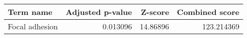 \begin{tabular}{lrrr}
\toprule
     Term name &  Adjusted p-value &  Z-score &  Combined score \\
\midrule
Focal adhesion &          0.013096 & 14.86896 &      123.214369 \\
\bottomrule
\end{tabular}
